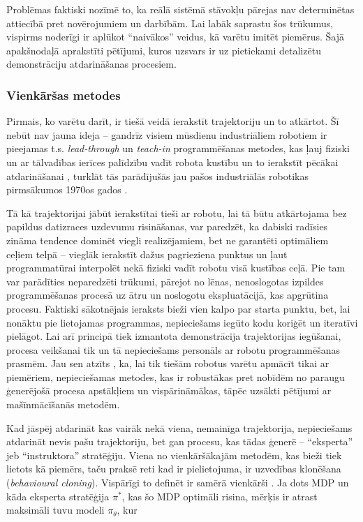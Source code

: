 \documentclass[12pt, a4paper]{article}
\numberwithin{equation}{section} %
\begin{document}
Problēmas faktiski nozīmē to, ka reālā sistēmā stāvokļu pārejas nav determinētas attiecībā pret novērojumiem un darbībām. Lai labāk saprastu šos trūkumus, vispirms noderīgi ir aplūkot ``naivākos'' veidus, kā varētu imitēt piemērus. Šajā apakšnodaļā aprakstīti pētījumi, kuros uzsvars ir uz pietiekami detalizētu demonstrāciju atdarināšanas procesiem.

\subsubsection{Vienkāršas metodes}

Pirmais, ko varētu darīt, ir tiešā veidā ierakstīt trajektoriju un to atkārtot. Šī nebūt nav jauna ideja -- gandrīz visiem mūsdienu industriāliem robotiem ir pieejamas t.s. \textit{lead-through} un \textit{teach-in} programmēšanas metodes, kas ļauj fiziski un ar tālvadības ierīces palīdzību vadīt robota kustību un to ierakstīt pēcākai atdarināšanai \cite{teach_pendant}, turklāt tās parādījušās jau pašos industriālās robotikas pirmsākumos 1970os gados \cite{abb2016special}.

Tā kā trajektorijai jābūt ierakstītai tieši ar robotu, lai tā būtu atkārtojama bez papildus datizraces uzdevumu risināšanas, var paredzēt, ka dabiski radīsies zināma tendence dominēt viegli realizējamiem, bet ne garantēti optimāliem ceļiem telpā -- vieglāk ierakstīt dažus pagrieziena punktus un ļaut programmatūrai interpolēt nekā fiziski vadīt robotu visā kustības ceļā. Pie tam var parādīties neparedzēti trūkumi, pārejot no lēnas, nenoslogotas izpildes programmēšanas procesā uz ātru un noslogotu ekspluatācijā, kas apgrūtina procesu. Faktiski sākotnējais ieraksts bieži vien kalpo par starta punktu, bet, lai nonāktu pie lietojamas programmas, nepieciešams iegūto kodu koriģēt un iteratīvi pielāgot. Lai arī principā tiek izmantota demonstrācija trajektorijas iegūšanai, procesa veikšanai tik un tā nepieciešams personāls ar robotu programmēšanas prasmēm. Jau sen atzīts \cite{muench1994robot,billard2008handbook}, ka, lai tik tiešām robotus varētu apmācīt tikai ar piemēriem, nepieciešamas metodes, kas ir robustākas pret nobīdēm no paraugu ģenerējošā procesa apstākļiem un vispārināmākas, tāpēc uzsākti pētījumi ar mašīnmācīšanās metodēm.

Kad jāspēj atdarināt kas vairāk nekā viena, nemainīga trajektorija, nepieciešams atdarināt nevis pašu trajektoriju, bet gan procesu, kas tādas ģenerē -- ``eksperta'' jeb ``instruktora'' stratēģiju. Viena no vienkāršākajām metodēm, kas bieži tiek lietots kā piemērs, taču praksē reti kad ir pielietojuma, ir uzvedības klonēšana (\textit{behavioural cloning}). Vispārīgi to definēt ir samērā vienkārši \cite{attia2018global}. Ja dots MDP un kāda eksperta stratēģija $\pi^*$, kas šo MDP optimāli risina, mērķis ir atrast maksimāli tuvu modeli $\pi_{\theta}$, kur
\end{document}
